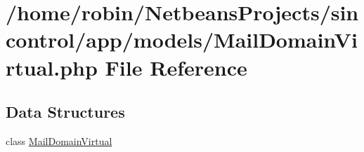 \hypertarget{_mail_domain_virtual_8php}{}\section{/home/robin/\+Netbeans\+Projects/sincontrol/app/models/\+Mail\+Domain\+Virtual.php File Reference}
\label{_mail_domain_virtual_8php}
\subsection*{Data Structures}
\begin{DoxyCompactItemize}
\item 
class \hyperlink{class_mail_domain_virtual}{Mail\+Domain\+Virtual}
\end{DoxyCompactItemize}
